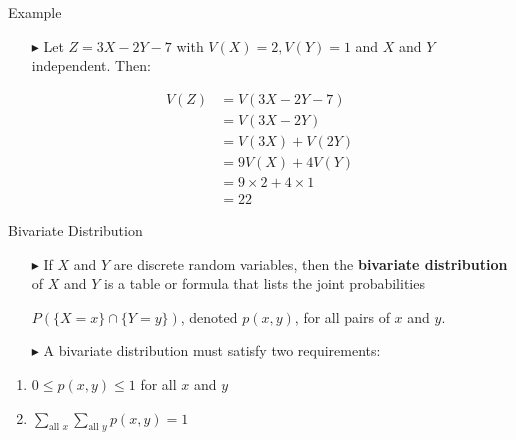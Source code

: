 \documentclass[12pt]{beamer}
\begin{document}
\begin{frame}{Example}
	\begin{itemize}
		\item[\color{blue}$\blacktriangleright$] Let $Z = 3X - 2Y -7$ with $V(X) = 2, V(Y) = 1$ and $X$ and $Y$ independent. Then:
	\end{itemize}
	
	\begin{align*}
		V(Z) &= V(3X - 2Y - 7)\\
		&=  V(3X - 2Y)\\
		&= V(3X)+V(2Y)\\
		&= 9V(X)+4V(Y)\\
		&= 9\times2+4\times1\\
		&=22
	\end{align*}
\end{frame}
\begin{frame}{Bivariate Distribution}
	
\begin{itemize}
\item[\color{blue}$\blacktriangleright$] If $X$ and $Y$ are discrete random variables, then the \textbf{bivariate distribution} of $X$ and $Y$ is a table or formula that lists the joint probabilities
		
		$P(\{X = x\} \cap \{Y = y\})$, denoted $p(x,y)$, for all pairs of $x$ and $y$.
		
\item[\color{blue}$\blacktriangleright$] A bivariate distribution must satisfy two requirements:
\end{itemize}

\begin{enumerate}[label=\textcolor{blue}{\arabic*.}]
	\item $0 \leq p(x,y) \leq 1$ for all $x$ and $y$
	\item $\sum_{\text{all }x} \sum_{\text{all }y} p(x,y) = 1$
\end{enumerate}

	
	
\end{frame}
\end{document}
